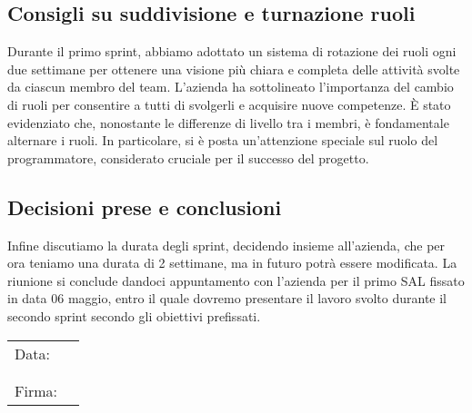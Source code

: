 \documentclass[italian,12pt]{article}
\begin{document}
\subsection{Consigli su suddivisione e turnazione ruoli}
Durante il primo sprint, abbiamo adottato un sistema di rotazione dei ruoli ogni due settimane per ottenere una visione più chiara e completa delle attività svolte da ciascun membro del team. L'azienda ha sottolineato l'importanza del cambio di ruoli per consentire a tutti di svolgerli e acquisire nuove competenze.
È stato evidenziato che, nonostante le differenze di livello tra i membri, è fondamentale alternare i ruoli. In particolare, si è posta un'attenzione speciale sul ruolo del programmatore, considerato cruciale per il successo del progetto.

\subsection{Decisioni prese e conclusioni}
Infine discutiamo la durata degli sprint, decidendo insieme all'azienda, che per ora teniamo una durata di 2 settimane, ma in futuro potrà essere modificata.
La riunione si conclude dandoci appuntamento con l'azienda per il primo SAL ﬁssato in data 06 maggio, entro il quale dovremo presentare il lavoro svolto durante il secondo sprint secondo gli obiettivi preﬁssati.

\begin{table}[b]
	\begin{tabular}{@{}p{.5in}p{4in}@{}}
		Data:  & \hrulefill \\
			   &     		\\
			   &     		\\
		Firma: & \hrulefill \\
	\end{tabular}
	\end{table}
\end{document}

